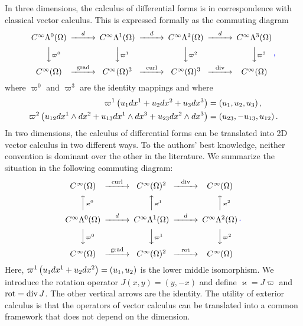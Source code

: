 \documentclass[10pt,a4paper]{article}
\newcommand\cye[1]{%
\protect\leavevmode
\begingroup
    \color{blue}%
    #1%
\endgroup
}
\begin{document}
\begin{remark}
    In three dimensions, 
    the calculus of differential forms is in correspondence with classical vector calculus. 
    This is expressed formally as the commuting diagram 
    \begin{gather*}
    \begin{CD}
        C^\infty\Alt^0(\Omega) @>{\cartan}>> C^\infty\Alt^1(\Omega) @>{\cartan}>> C^\infty\Alt^2(\Omega) @>{\cartan}>> C^\infty\Alt^3(\Omega) 
        \\
        @VV{\varpi^{0}}V 
        @VV{\varpi^{1}}V 
        @VV{\varpi^{2}}V 
        @VV{\varpi^{3}}V 
        \\
        C^\infty(\Omega) @>{\grad}>> C^\infty(\Omega)^{3} @>{\curl}>> C^\infty(\Omega)^{3} @>{\divergence}>> C^\infty(\Omega)
    \end{CD}
    \cye{\, ,}
    \end{gather*}
    where $\varpi^{0}$ and $\varpi^{3}$ are the identity mappings and where 
    \begin{align*}
     \varpi^{1}\left( u_1 dx^{1} + u_2 dx^{2} + u_3 dx^{3} \right) 
     &= 
     \left( u_1, u_2, u_3 \right), 
     \\
     \varpi^{2}\left( u_{12} dx^{1} \wedge dx^{2} + u_{13} dx^{1} \wedge dx^{3} + u_{23} dx^{2} \wedge dx^{3} \right) 
     &= 
     \left( u_{23}, - u_{13}, u_{12} \right).   
    \end{align*}
    In two dimensions, 
    the calculus of differential forms can be translated into 2D vector calculus in two different ways. 
    To the authors' best knowledge, neither convention is dominant over the other in the literature.
    We summarize the situation in the following commuting diagram: 
    \begin{gather*} 
    \begin{CD}
        C^\infty(\Omega) @>{\curl}>> C^\infty(\Omega)^{2} @>{\divergence}>> C^\infty(\Omega)
        \\
        @AA{\varkappa^{0}}A 
        @AA{\varkappa^{1}}A 
        @AA{\varkappa^{2}}A 
        \\
        C^\infty\Alt^0(\Omega) @>{\cartan}>> C^\infty\Alt^1(\Omega) @>{\cartan}>> C^\infty\Alt^2(\Omega) 
        \\
        @VV{\varpi^{0}}V 
        @VV{\varpi^{1}}V 
        @VV{\varpi^{2}}V 
        \\
        C^\infty(\Omega) @>{\grad}>> C^\infty(\Omega)^{2} @>{\rot}>> C^\infty(\Omega)
    \end{CD}
    \cye{\,.}
    \end{gather*}
    Here, $\varpi^{1}\left( u_1 dx^{1} + u_2 dx^{2} \right) = \left( u_1, u_2 \right)$ is the lower middle isomorphism. We introduce the rotation operator $J(x,y) = (y,-x)$ and define $\varkappa = J \varpi$ and $\operatorname{rot} = \operatorname{div} J$.
    The other vertical arrows are the identity. 
    The utility of exterior calculus is that the operators of vector calculus can be translated into a common framework that does not depend on the dimension.
\end{remark}
\end{document}
